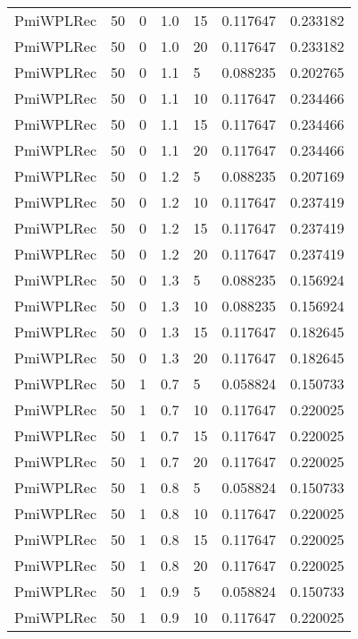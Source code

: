 \begin{tabular}{lllrlrr}
 PmiWPLRec &   50 &     0 &   1.0 &   15 &     0.117647 &  0.233182 \\
 PmiWPLRec &   50 &     0 &   1.0 &   20 &     0.117647 &  0.233182 \\
 PmiWPLRec &   50 &     0 &   1.1 &    5 &     0.088235 &  0.202765 \\
 PmiWPLRec &   50 &     0 &   1.1 &   10 &     0.117647 &  0.234466 \\
 PmiWPLRec &   50 &     0 &   1.1 &   15 &     0.117647 &  0.234466 \\
 PmiWPLRec &   50 &     0 &   1.1 &   20 &     0.117647 &  0.234466 \\
 PmiWPLRec &   50 &     0 &   1.2 &    5 &     0.088235 &  0.207169 \\
 PmiWPLRec &   50 &     0 &   1.2 &   10 &     0.117647 &  0.237419 \\
 PmiWPLRec &   50 &     0 &   1.2 &   15 &     0.117647 &  0.237419 \\
 PmiWPLRec &   50 &     0 &   1.2 &   20 &     0.117647 &  0.237419 \\
 PmiWPLRec &   50 &     0 &   1.3 &    5 &     0.088235 &  0.156924 \\
 PmiWPLRec &   50 &     0 &   1.3 &   10 &     0.088235 &  0.156924 \\
 PmiWPLRec &   50 &     0 &   1.3 &   15 &     0.117647 &  0.182645 \\
 PmiWPLRec &   50 &     0 &   1.3 &   20 &     0.117647 &  0.182645 \\
 PmiWPLRec &   50 &     1 &   0.7 &    5 &     0.058824 &  0.150733 \\
 PmiWPLRec &   50 &     1 &   0.7 &   10 &     0.117647 &  0.220025 \\
 PmiWPLRec &   50 &     1 &   0.7 &   15 &     0.117647 &  0.220025 \\
 PmiWPLRec &   50 &     1 &   0.7 &   20 &     0.117647 &  0.220025 \\
 PmiWPLRec &   50 &     1 &   0.8 &    5 &     0.058824 &  0.150733 \\
 PmiWPLRec &   50 &     1 &   0.8 &   10 &     0.117647 &  0.220025 \\
 PmiWPLRec &   50 &     1 &   0.8 &   15 &     0.117647 &  0.220025 \\
 PmiWPLRec &   50 &     1 &   0.8 &   20 &     0.117647 &  0.220025 \\
 PmiWPLRec &   50 &     1 &   0.9 &    5 &     0.058824 &  0.150733 \\
 PmiWPLRec &   50 &     1 &   0.9 &   10 &     0.117647 &  0.220025 \\

\end{tabular}
